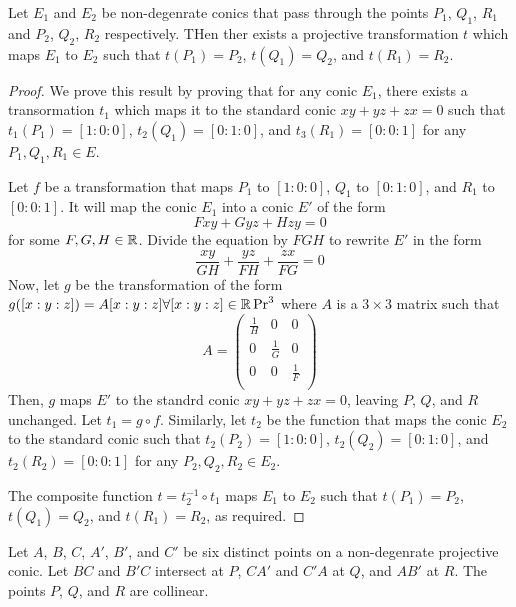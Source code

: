 \begin{prop}
  Let $E_1$ and $E_2$ be non-degenrate conics that pass through the points $P_1$, $Q_1$, $R_1$
  and $P_2$, $Q_2$, $R_2$ respectively. THen ther exists a projective transformation $t$ which
  maps $E_1$ to $E_2$ such that $t(P_1)=P_2$, $t(Q_1)=Q_2$, and $t(R_1)=R_2$.
\end{prop}

\begin{proof}
  We prove this result by proving that for any conic $E_1$, there exists a transormation $t_1$
  which maps it to the standard conic $xy+yz+zx=0$ such that $t_1(P_1)=[1:0:0]$,
  $t_2(Q_1)=[0:1:0]$, and $t_3(R_1)=[0:0:1]$ for any $P_1,Q_1,R_1\in E$.

  Let $f$ be a transformation that maps $P_1$ to $[1:0:0]$, $Q_1$ to $[0:1:0]$, and $R_1$ to
  $[0:0:1]$. It will map the conic $E_1$ into a conic $E'$ of the form
  \[
    Fxy+Gyz+Hzy=0
  \]
  for some $F,G,H\in\mathbb{R}$. Divide the equation by $FGH$ to rewrite $E'$ in the form
  \[
    \frac{xy}{GH}+\frac{yz}{FH}+\frac{zx}{FG}=0
  \]
  Now, let $g$ be the transformation of the form $g([x:y:z])=A[x:y:z]\forall[x:y:z]\in\mathbb{R}\Pr^3$
  where $A$ is a $3\times 3$ matrix such that
  \[
    A=
    \left(\begin{array}{ccc}
      \frac{1}{H} & 0           & 0           \\
      0           & \frac{1}{G} & 0           \\
      0           & 0           & \frac{1}{F} \\
    \end{array}\right)
  \]
  Then, $g$ maps $E'$ to the standrd conic $xy+yz+zx=0$, leaving $P$, $Q$, and $R$ unchanged.
  Let $t_1=g\circ f$. Similarly, let $t_2$ be the function that maps the conic $E_2$ to the
  standard conic such that $t_2(P_2)=[1:0:0]$, $t_2(Q_2)=[0:1:0]$, and $t_2(R_2)=[0:0:1]$
  for any $P_2,Q_2,R_2\in E_2$.

  The composite function $t=t_2^{-1}\circ t_1$ maps $E_1$ to $E_2$ such that $t(P_1)=P_2$,
  $t(Q_1)=Q_2$, and $t(R_1)=R_2$, as required.
\end{proof}

\begin{theorem}
  Let $A$, $B$, $C$, $A'$, $B'$, and $C'$ be six distinct points on a non-degenrate projective
  conic. Let $BC$ and $B'C$ intersect at $P$, $CA'$ and $C'A$ at $Q$, and $AB'$ at $R$. The
  points $P$, $Q$, and $R$ are collinear.
\end{theorem}

